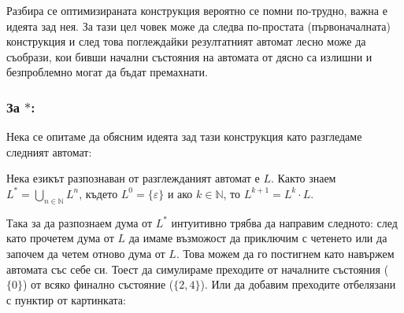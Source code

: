 \documentclass[12pt]{article}
\begin{document}
Разбира се оптимизираната конструкция вероятно се помни по-трудно, важна е идеята зад нея.
За тази цел човек може да следва по-простата (първоначалната) конструкция и след това поглеждайки резултатният автомат лесно може да съобрази,
кои бивши начални състояния на автомата от дясно са излишни и безпроблемно могат да бъдат премахнати.

\subsubsection{За \(*\):}
Нека се опитаме да обясним идеята зад тази конструкция като разгледаме следният автомат:

\begin{center}
\end{center}

Нека езикът разпознаван от разглежданият автомат е \(L\).
Както знаем \(L^* = \displaystyle\bigcup_{n \in \mathbb{N}} L^n\),
където \(L^0 = \{\varepsilon\}\) и ако \(k \in \mathbb{N}\), то \(L^{k + 1} = L^k\cdot L\). \\\par
Така за да разпознаем дума от \(L^*\) интуитивно трябва да направим следното:
след като прочетем дума от \(L\) да имаме възможост да приключим с четенето
или да започем да четем отново дума от \(L\).
Това можем да го постигнем като навържем автомата със себе си.
Тоест да симулираме преходите от началните състояния (\(\{0\}\)) от всяко финално състояние (\(\{2, 4\}\)).
Или да добавим преходите отбелязани с пунктир от картинката:

\begin{center}
\end{center}
\end{document}
